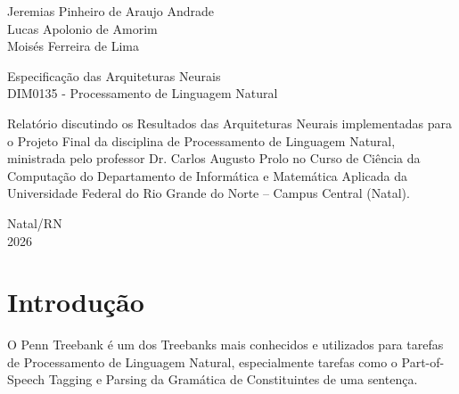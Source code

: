 \documentclass[a4paper,12pt]{article}
\begin{document}
\begin{titlepage}
    \thispagestyle{empty} %
    \begin{center}
        {\large {Jeremias Pinheiro de Araujo Andrade}} \\
        {\large {Lucas Apolonio de Amorim}} \\
        {\large {Moisés Ferreira de Lima}} \\
        \vspace{4cm}

        {\large {Especificação das Arquiteturas Neurais}} \\
        {\large {DIM0135 - Processamento de Linguagem Natural}}
        \vspace{6cm}
        \begin{flushright}
            \begin{minipage}{0.5\textwidth}
            Relatório discutindo os Resultados das Arquiteturas Neurais implementadas para o Projeto Final da disciplina de Processamento de Linguagem Natural, ministrada pelo professor Dr. Carlos Augusto Prolo no Curso de Ciência da Computação do Departamento de Informática e Matemática Aplicada da Universidade Federal do Rio Grande do Norte – Campus Central (Natal). \\
            \end{minipage}
        \end{flushright}
    \end{center}

    \vspace{4cm}
    \begin{center}
        {\large Natal/RN} \\
        {\large 2026}
    \end{center}
\end{titlepage}


\renewcommand{\contentsname}{\begin{center}Conteúdos\end{center}}
\tableofcontents
\thispagestyle{empty}

\newpage

\setcounter{page}{3}

\section{Introdução}
O Penn Treebank é um dos Treebanks mais conhecidos e utilizados para tarefas de Processamento de Linguagem Natural, especialmente tarefas como o Part-of-Speech Tagging e Parsing da Gramática de Constituintes de uma sentença.
\end{document}

